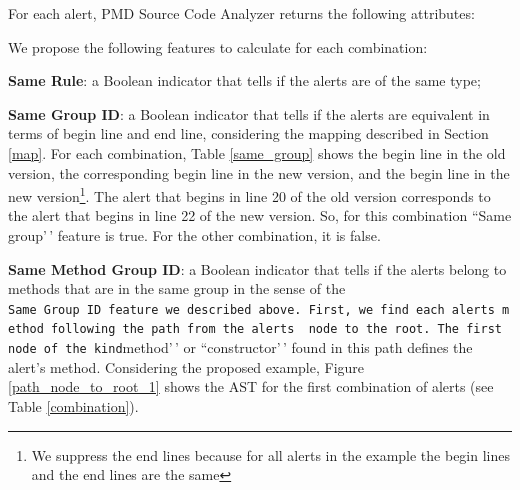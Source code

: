 \documentclass[
]{article}
\begin{document}
For each alert, PMD Source Code Analyzer returns the following
attributes:

\vspace{16pt}

We propose the following features to calculate for each combination:

\textbf{Same Rule}: a Boolean indicator that tells if the alerts are of
the same type;

\textbf{Same Group ID}: a Boolean indicator that tells if the alerts are
equivalent in terms of begin line and end line, considering the mapping
described in Section \ref{map}. For each combination, Table
\ref{same_group} shows the begin line in the old version, the
corresponding begin line in the new version, and the begin line in the
new
version\footnote{We suppress the end lines because for all alerts in the 
example the begin lines and the end lines are the same}. The alert that
begins in line 20 of the old version corresponds to the alert that
begins in line 22 of the new version. So, for this combination ``Same
group'\,' feature is true. For the other combination, it is false.

\small

\begin{table}[H]

\caption{\label{tab:unnamed-chunk-7}Same group feature \label{same_group}}
\centering
{}
\end{table}

\normalsize

\noindent \textbf{Same Method Group ID}: a Boolean indicator that tells
if the alerts belong to methods that are in the same group in the sense
of the
\texttt{Same\ Group\ ID\textquotesingle{}\textquotesingle{}\ feature\ we\ described\ above.\ First,\ we\ find\ each\ alert\textquotesingle{}s\ method\ following\ the\ path\ from\ the\ alert\textquotesingle{}s\ \ node\ to\ the\ root.\ The\ first\ node\ of\ the\ kind}method'\,'
or ``constructor'\,' found in this path defines the alert's method.
Considering the proposed example, Figure \ref{path_node_to_root_1} shows
the AST for the first combination of alerts (see Table
\ref{combination}).
\end{document}

